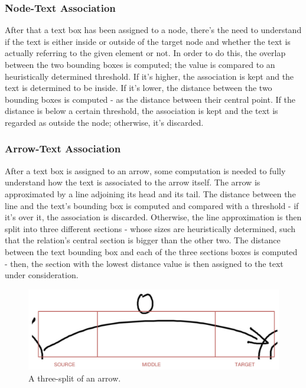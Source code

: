 \documentclass[conference]{IEEEtran}
\begin{document}
\subsubsection{Node-Text Association}
After that a text box has been assigned to a node, there's the need to understand if the text is either inside or outside of the target node and whether the text is actually referring to the given element or not. In order to do this, the overlap between the two bounding boxes is computed; the value is compared to an heuristically determined threshold. If it's higher, the association is kept and the text is determined to be inside. If it's lower, the distance between the two bounding boxes is computed - as the distance between their central point. If the distance is below a certain threshold, the association is kept and the text is regarded as outside the node; otherwise, it's discarded.\\

\subsubsection{Arrow-Text Association}
After a text box is assigned to an arrow, some computation is needed to fully understand how the text is associated to the arrow itself. The arrow is approximated by a line adjoining its head and its tail. The distance between the line and the text's bounding box is computed and compared with a threshold - if it's over it, the association is discarded. Otherwise, the line approximation is then split into three different sections - whose sizes are heuristically determined, such that the relation's central section is bigger than the other two. The distance between the text bounding box and each of the three sections boxes is computed - then, the section with the lowest distance value is then assigned to the text under consideration. \\

\begin{figure}
	\centering
	\includegraphics[width=\linewidth]{arrowsplit.jpg}
	\caption{A three-split of an arrow.}
	\label{fig:arrowsplit}
\end{figure}
\end{document}
